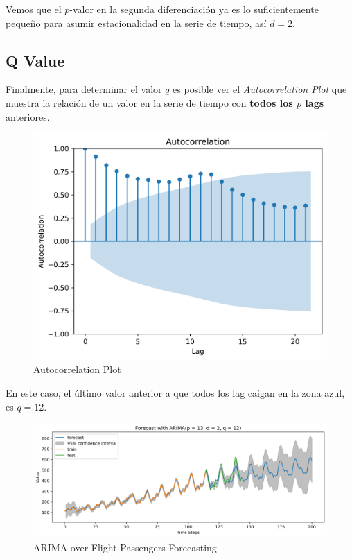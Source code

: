 Vemos que el $p$-valor en la segunda diferenciación ya es lo suficientemente pequeño para asumir estacionalidad en la serie de tiempo, así $d=2$. 

\subsection{Q Value}
Finalmente, para determinar el valor $q$ es posible ver el \textit{Autocorrelation Plot} que muestra la relación de un valor en la serie de tiempo con \textbf{todos los $p$ lags} anteriores. 
\begin{figure}[H]
    \center
    \includegraphics[scale=0.5]{notebooks/TS/img/autocorrelation.png}
    \caption{Autocorrelation Plot}
\end{figure}
En este caso, el último valor anterior a que todos los lag caigan en la zona azul, es $q=12$.
\begin{figure}[H]
    \center
    \includegraphics[scale=0.5]{notebooks/TS/img/arima_results.png}
    \caption{ARIMA over Flight Passengers Forecasting}
\end{figure}